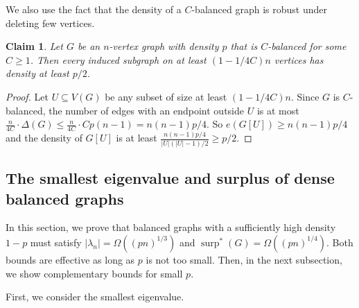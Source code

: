 \documentclass[11pt]{article}
\theoremstyle{plain}
\newtheorem{claim}[theorem]{Claim}
\theoremstyle{definition}
\DeclareMathOperator{\surp}{surp}
\begin{document}
We also use the fact that the density of a $C$-balanced graph is robust under deleting few vertices.

\begin{claim}\label{lemma: balanced graphs are robust}
    Let $G$ be an $n$-vertex graph with density $p$ that is $C$-balanced for some $C \ge 1$.
    Then every induced subgraph on at least $(1-1/4C)n$ vertices has density at least $p/2$.
\end{claim}
\begin{proof}
    Let $U\subseteq V(G)$ be any subset of size at least $(1-1/4C)n$.
    Since $G$ is $C$-balanced, the number of edges with an endpoint outside $U$ is at most $\frac{n}{4C}\cdot\Delta(G) \le \frac{n}{4C}\cdot Cp(n-1)=n(n-1)p/4$.
    So $e(G[U]) \ge n(n-1)p/4$ and the density of $G[U]$ is at least $\frac{n(n-1)p/4}{|U|(|U|-1)/2} \ge p/2$.
\end{proof}


\subsection{The smallest eigenvalue and surplus of dense balanced graphs}\label{subsec: hadamard bounds}

In this section, we prove that balanced graphs with a sufficiently high density $1-p$ must satisfy $|\lambda_n|=\Omega((pn)^{1/3})$ and $\surp^*(G)=\Omega((pn)^{1/4})$.
Both bounds are effective as long as $p$ is not too small.
Then, in the next subsection, we show complementary bounds for small $p$.

First, we consider the smallest eigenvalue.
\end{document}

